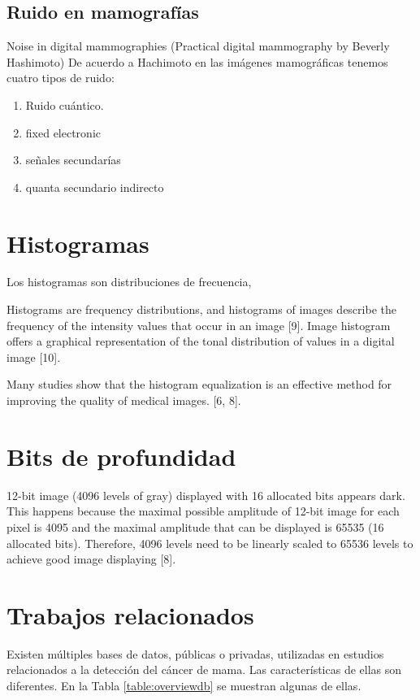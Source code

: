 \subsection{Ruido en mamografías}

Noise in digital mammographies (Practical digital mammography by Beverly
Hashimoto) De acuerdo a Hachimoto en las imágenes mamográficas tenemos cuatro
tipos de ruido:

\begin{enumerate}
    \item Ruido cuántico.
    \item fixed electronic
    \item señales secundarías
    \item quanta secundario indirecto
\end{enumerate}

\section{Histogramas}
Los histogramas son distribuciones de frecuencia, 

Histograms are frequency distributions, and histograms of images describe the
frequency of the intensity values that occur in an image [9]. Image histogram
offers a graphical representation of the tonal distribution of values in a
digital image [10].


Many studies show that the histogram equalization is an effective method for
improving the quality of medical images. [6, 8]. 

\section{Bits de profundidad}

12-bit image (4096 levels of gray) displayed with 16 allocated bits appears
dark. This happens because the maximal possible amplitude of 12-bit image for
each pixel is 4095 and the maximal amplitude that can be displayed is 65535 (16
allocated bits). Therefore, 4096 levels need to be linearly scaled to 65536
levels to achieve good image displaying [8].

\section{Trabajos relacionados}

Existen múltiples bases de datos, públicas o privadas, utilizadas en estudios
relacionados a la detección del cáncer de mama. Las características de ellas
son diferentes. En la Tabla \ref{table:overviewdb} se muestran algunas de ellas.

